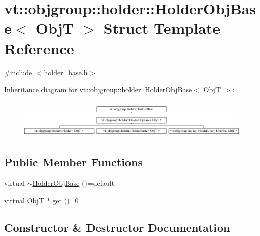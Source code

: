 \hypertarget{structvt_1_1objgroup_1_1holder_1_1_holder_obj_base}{}\section{vt\+:\+:objgroup\+:\+:holder\+:\+:Holder\+Obj\+Base$<$ ObjT $>$ Struct Template Reference}
\label{structvt_1_1objgroup_1_1holder_1_1_holder_obj_base}


{\ttfamily \#include $<$holder\+\_\+base.\+h$>$}

Inheritance diagram for vt\+:\+:objgroup\+:\+:holder\+:\+:Holder\+Obj\+Base$<$ ObjT $>$\+:\begin{figure}[H]
\begin{center}
\leavevmode
\includegraphics[height=1.866667cm]{structvt_1_1objgroup_1_1holder_1_1_holder_obj_base}
\end{center}
\end{figure}
\subsection*{Public Member Functions}
\begin{DoxyCompactItemize}
\item 
virtual \hyperlink{structvt_1_1objgroup_1_1holder_1_1_holder_obj_base_a368d2b1e12c87f11475ecf13dcb66129}{$\sim$\+Holder\+Obj\+Base} ()=default
\item 
virtual ObjT $\ast$ \hyperlink{structvt_1_1objgroup_1_1holder_1_1_holder_obj_base_a4b350b0126259d31a62fd426a08f6698}{get} ()=0
\end{DoxyCompactItemize}


\subsection{Constructor \& Destructor Documentation}
\mbox{\label{structvt_1_1objgroup_1_1holder_1_1_holder_obj_base_a368d2b1e12c87f11475ecf13dcb66129}} 
